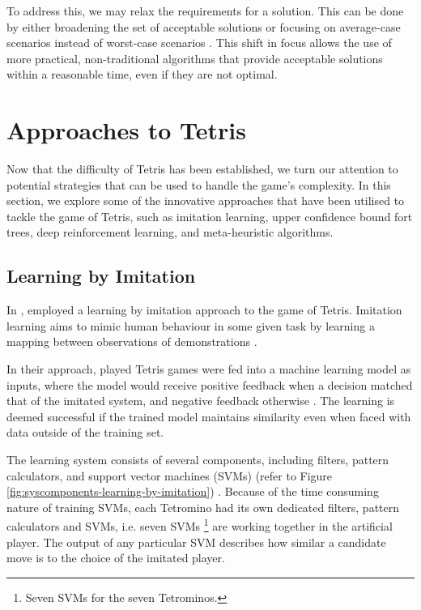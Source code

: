 \documentclass[a4paper, 12pt]{extreport}
\begin{document}
	To address this, we may relax the requirements for a solution. This can be done by either broadening the set of acceptable solutions or focusing on average-case scenarios instead of worst-case scenarios \cite{cc:conceptual-perspective}. This shift in focus allows the use of more practical, non-traditional algorithms that provide acceptable solutions within a reasonable time, even if they are not optimal. 
	
	\section{Approaches to Tetris}
	
	
	Now that the difficulty of Tetris has been established, we turn our attention to potential strategies that can be used to handle the game's complexity. In this section, we explore some of the innovative approaches that have been utilised to tackle the game of Tetris, such as imitation learning, upper confidence bound fort trees, deep reinforcement learning, and meta-heuristic algorithms.
	
	\subsection{Learning by Imitation} \label{subsec:imit-learning}
	
	In \citeyear{tetris-learning-by-imitation}, \citeauthor{tetris-learning-by-imitation} \cite{tetris-learning-by-imitation} employed a learning by imitation approach to the game of Tetris. Imitation learning aims to mimic human behaviour in some given task by learning a mapping between observations of demonstrations \cite{imitation-learning}.
	
	In their approach, played Tetris games were fed into a machine learning model as inputs, where the model would receive positive feedback when a decision matched that of the imitated system, and negative feedback otherwise \cite{tetris-learning-by-imitation}. The learning is deemed successful if the trained model maintains similarity even when faced with data outside of the training set.
	
	The learning system consists of several components, including filters, pattern calculators, and support vector machines (SVMs) (refer to Figure \ref{fig:syscomponents-learning-by-imitation}) \cite{tetris-learning-by-imitation}. Because of the time consuming nature of training SVMs, each Tetromino had its own dedicated filters, pattern calculators and SVMs, i.e. seven SVMs \footnote{Seven SVMs for the seven Tetrominos.} are working together in the artificial player. The output of any particular SVM describes how similar a candidate move is to the choice of the imitated player.
	
\end{document}
